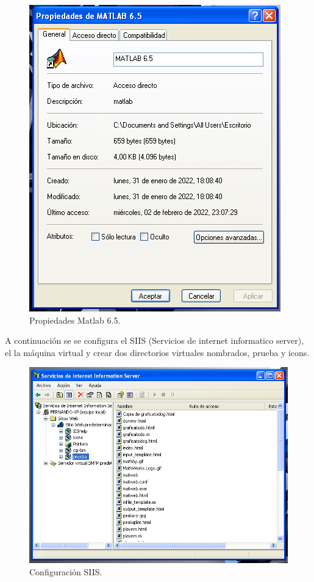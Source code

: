\documentclass[12pt,letterpaper]{article}
\begin{document}
\begin{multicols}{2}
\begin{figure}[H]
\centering
\includegraphics[width = \columnwidth]{Propiedades_matlab.png}
\caption{Propiedades Matlab 6.5.}
\end{figure}

A continuación se se configura el SIIS (Servicios de internet informatico server), el la máquina virtual y crear dos directorios virtuales nombrados, prueba y icons.\\


\begin{figure}[H]
\centering
\includegraphics[width = \columnwidth]{SIIS.png}
\caption{Configuración SIIS.}
\label{SIIS}
\end{figure}


\end{multicols}
\end{document}
